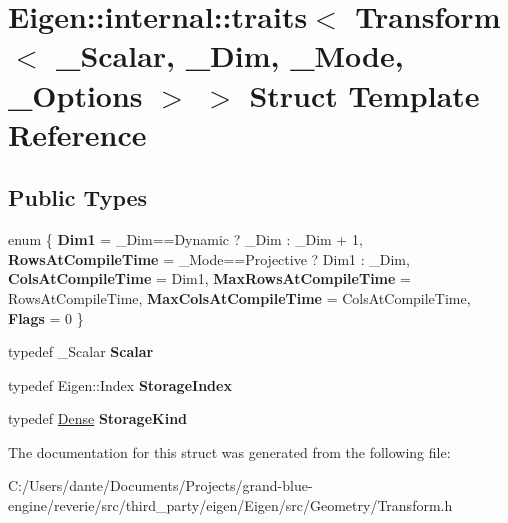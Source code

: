 \hypertarget{struct_eigen_1_1internal_1_1traits_3_01_transform_3_01___scalar_00_01___dim_00_01___mode_00_01___options_01_4_01_4}{}\section{Eigen\+::internal\+::traits$<$ Transform$<$ \+\_\+\+Scalar, \+\_\+\+Dim, \+\_\+\+Mode, \+\_\+\+Options $>$ $>$ Struct Template Reference}
\label{struct_eigen_1_1internal_1_1traits_3_01_transform_3_01___scalar_00_01___dim_00_01___mode_00_01___options_01_4_01_4}
\subsection*{Public Types}
\begin{DoxyCompactItemize}
\item 
\mbox{\label{struct_eigen_1_1internal_1_1traits_3_01_transform_3_01___scalar_00_01___dim_00_01___mode_00_01___options_01_4_01_4_a277c75d0efddfb3adf5bfc7877d87959}} 
enum \{ \newline
{\bfseries Dim1} = \+\_\+\+Dim==Dynamic ? \+\_\+\+Dim \+: \+\_\+\+Dim + 1, 
{\bfseries Rows\+At\+Compile\+Time} = \+\_\+\+Mode==Projective ? Dim1 \+: \+\_\+\+Dim, 
{\bfseries Cols\+At\+Compile\+Time} = Dim1, 
{\bfseries Max\+Rows\+At\+Compile\+Time} = Rows\+At\+Compile\+Time, 
\newline
{\bfseries Max\+Cols\+At\+Compile\+Time} = Cols\+At\+Compile\+Time, 
{\bfseries Flags} = 0
 \}
\item 
\mbox{\label{struct_eigen_1_1internal_1_1traits_3_01_transform_3_01___scalar_00_01___dim_00_01___mode_00_01___options_01_4_01_4_a752d8ba2ed25861d5053c89b7a61e754}} 
typedef \+\_\+\+Scalar {\bfseries Scalar}
\item 
\mbox{\label{struct_eigen_1_1internal_1_1traits_3_01_transform_3_01___scalar_00_01___dim_00_01___mode_00_01___options_01_4_01_4_a8aff88c71a2ca27edf22fa931c3740aa}} 
typedef Eigen\+::\+Index {\bfseries Storage\+Index}
\item 
\mbox{\label{struct_eigen_1_1internal_1_1traits_3_01_transform_3_01___scalar_00_01___dim_00_01___mode_00_01___options_01_4_01_4_a51db0187bef42885b7427a6de872565c}} 
typedef \mbox{\hyperlink{struct_eigen_1_1_dense}{Dense}} {\bfseries Storage\+Kind}
\end{DoxyCompactItemize}


The documentation for this struct was generated from the following file\+:\begin{DoxyCompactItemize}
\item 
C\+:/\+Users/dante/\+Documents/\+Projects/grand-\/blue-\/engine/reverie/src/third\+\_\+party/eigen/\+Eigen/src/\+Geometry/Transform.\+h\end{DoxyCompactItemize}
